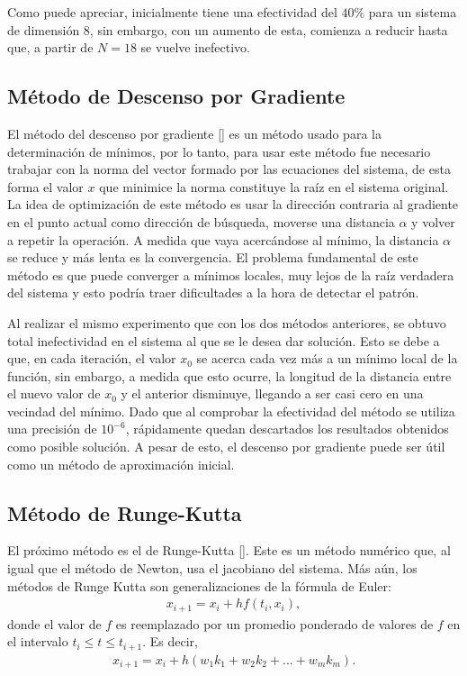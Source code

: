 \par Como puede apreciar, inicialmente tiene una efectividad del $40\%$ para un sistema de dimensi\'on $8$, sin embargo, con un aumento de esta, comienza a reducir hasta que, a partir de $N=18$ se vuelve inefectivo.

\subsection{M\'etodo de Descenso por Gradiente}

\par El m\'etodo del descenso por gradiente [\cite{23}] es un m\'etodo usado para la determinaci\'on de m\'inimos, por lo tanto, para usar este m\'etodo fue necesario trabajar con la norma del vector formado por las ecuaciones del sistema, de esta forma el valor $x$ que minimice la norma constituye la ra\'iz en el sistema original. La idea de optimizaci\'on de este m\'etodo es usar la direcci\'on contraria al gradiente en el punto actual como direcci\'on de b\'usqueda, moverse una distancia $\alpha$ y volver a repetir la operaci\'on. A medida que vaya acerc\'andose al m\'inimo, la distancia $\alpha$ se reduce y m\'as lenta es la convergencia. El problema fundamental de este m\'etodo es que puede converger a m\'inimos locales, muy lejos de la ra\'iz verdadera del sistema y esto podr\'ia traer dificultades a la hora de detectar el patr\'on.\\

\par Al realizar el mismo experimento que con los dos m\'etodos anteriores, se obtuvo total inefectividad en el sistema al que se le desea dar soluci\'on. Esto se debe a que, en cada iteraci\'on, el valor $x_0$ se acerca cada vez m\'as a un m\'inimo local de la funci\'on, sin embargo, a medida que esto ocurre, la longitud de la distancia entre el nuevo valor de $x_0$ y el anterior disminuye, llegando a ser casi cero en una vecindad del m\'inimo. Dado que al comprobar la efectividad del m\'etodo se utiliza una precisi\'on de $10^{-6}$, r\'apidamente quedan descartados los resultados obtenidos como posible soluci\'on. A pesar de esto, el descenso por gradiente puede ser \'util como un m\'etodo de aproximaci\'on inicial.

\subsection{M\'etodo de Runge-Kutta}

\par El pr\'oximo m\'etodo es el de Runge-Kutta [\cite{23}]. Este es un m\'etodo num\'erico que, al igual que el m\'etodo de Newton, usa el jacobiano del sistema. M\'as a\'un, 
los m\'etodos de Runge Kutta son generalizaciones de la f\'ormula de Euler:
\begin{eqnarray}
x_{i+1}=x_{i}+hf(t_i,x_i),\nonumber
\end{eqnarray}
donde el valor de $f$ es reemplazado por un promedio ponderado de valores de $f$ en el intervalo $t_i\leq t \leq t_{i+1}$. Es decir,
\begin{eqnarray}
x_{i+1}=x_i+h(w_1k_1+w_2k_2+...+w_mk_m).\nonumber
\end{eqnarray}

